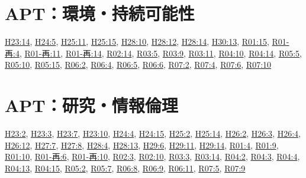 \section{APT：環境・持続可能性}
\hyperref[q:h23-reg-apt-14]{H23:14}, \hyperref[q:h24-reg-apt-05]{H24:5}, \hyperref[q:h25-reg-apt-11]{H25:11}, \hyperref[q:h25-reg-apt-15]{H25:15}, \hyperref[q:h28-reg-apt-10]{H28:10}, \hyperref[q:h28-reg-apt-12]{H28:12}, \hyperref[q:h28-reg-apt-14]{H28:14}, \hyperref[q:h30-reg-apt-13]{H30:13}, \hyperref[q:r01-reg-apt-15]{R01:15}, \hyperref[q:r01-ret-apt-04]{R01-再:4}, \hyperref[q:r01-ret-apt-11]{R01-再:11}, \hyperref[q:r01-ret-apt-14]{R01-再:14}, \hyperref[q:r02-reg-apt-14]{R02:14}, \hyperref[q:r03-reg-apt-05]{R03:5}, \hyperref[q:r03-reg-apt-09]{R03:9}, \hyperref[q:r03-reg-apt-11]{R03:11}, \hyperref[q:r04-reg-apt-10]{R04:10}, \hyperref[q:r04-reg-apt-14]{R04:14}, \hyperref[q:r05-reg-apt-05]{R05:5}, \hyperref[q:r05-reg-apt-10]{R05:10}, \hyperref[q:r05-reg-apt-15]{R05:15}, \hyperref[q:r06-reg-apt-02]{R06:2}, \hyperref[q:r06-reg-apt-04]{R06:4}, \hyperref[q:r06-reg-apt-05]{R06:5}, \hyperref[q:r06-reg-apt-06]{R06:6}, \hyperref[q:r07-reg-apt-02]{R07:2}, \hyperref[q:r07-reg-apt-04]{R07:4}, \hyperref[q:r07-reg-apt-06]{R07:6}, \hyperref[q:r07-reg-apt-10]{R07:10}
\section{APT：研究・情報倫理}
\hyperref[q:h23-reg-apt-02]{H23:2}, \hyperref[q:h23-reg-apt-03]{H23:3}, \hyperref[q:h23-reg-apt-07]{H23:7}, \hyperref[q:h23-reg-apt-10]{H23:10}, \hyperref[q:h24-reg-apt-04]{H24:4}, \hyperref[q:h24-reg-apt-15]{H24:15}, \hyperref[q:h25-reg-apt-02]{H25:2}, \hyperref[q:h25-reg-apt-14]{H25:14}, \hyperref[q:h26-reg-apt-02]{H26:2}, \hyperref[q:h26-reg-apt-03]{H26:3}, \hyperref[q:h26-reg-apt-04]{H26:4}, \hyperref[q:h26-reg-apt-12]{H26:12}, \hyperref[q:h27-reg-apt-07]{H27:7}, \hyperref[q:h27-reg-apt-08]{H27:8}, \hyperref[q:h28-reg-apt-04]{H28:4}, \hyperref[q:h28-reg-apt-13]{H28:13}, \hyperref[q:h29-reg-apt-06]{H29:6}, \hyperref[q:h29-reg-apt-11]{H29:11}, \hyperref[q:h29-reg-apt-14]{H29:14}, \hyperref[q:r01-reg-apt-04]{R01:4}, \hyperref[q:r01-reg-apt-09]{R01:9}, \hyperref[q:r01-reg-apt-10]{R01:10}, \hyperref[q:r01-ret-apt-06]{R01-再:6}, \hyperref[q:r01-ret-apt-10]{R01-再:10}, \hyperref[q:r02-reg-apt-03]{R02:3}, \hyperref[q:r02-reg-apt-10]{R02:10}, \hyperref[q:r03-reg-apt-03]{R03:3}, \hyperref[q:r03-reg-apt-14]{R03:14}, \hyperref[q:r04-reg-apt-02]{R04:2}, \hyperref[q:r04-reg-apt-03]{R04:3}, \hyperref[q:r04-reg-apt-04]{R04:4}, \hyperref[q:r04-reg-apt-13]{R04:13}, \hyperref[q:r04-reg-apt-15]{R04:15}, \hyperref[q:r05-reg-apt-02]{R05:2}, \hyperref[q:r05-reg-apt-07]{R05:7}, \hyperref[q:r06-reg-apt-08]{R06:8}, \hyperref[q:r06-reg-apt-09]{R06:9}, \hyperref[q:r06-reg-apt-11]{R06:11}, \hyperref[q:r07-reg-apt-05]{R07:5}, \hyperref[q:r07-reg-apt-09]{R07:9}
